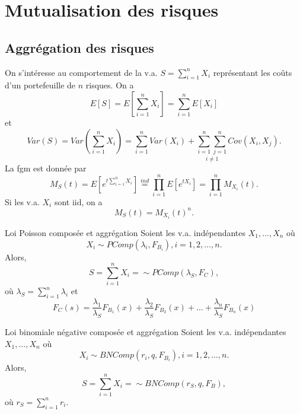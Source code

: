 \chapter{Mutualisation des risques}

\section{Aggrégation des risques}

On s'intéresse au comportement de la v.a. $S = \sum_{i = 1}^{n}X_i$ représentant les coûts  d'un portefeuille de $n$ risques. On a 
$$E[S] = E\left[\sum_{i = 1}^{n} X_i\right] = \sum_{i = 1}^{n}E[X_i]$$
et
$$Var(S) = Var\left(\sum_{i = 1}^{n}X_i\right) = \sum_{i = 1}^{n} Var(X_i) + \underset{i \neq 1}{\sum_{i = 1}^{n}\sum_{j = 1}^{n}}Cov(X_i, X_j).$$
La fgm est donnée par 
$$M_S(t) = E\left[e^{t\sum_{i = 1}^{n}X_i}\right] \stackrel{ind}{=} \prod_{i = 1}^{n} E\left[e^{tX_i}\right] = \prod_{i = 1}^{n}M_{X_i}(t).$$
Si les v.a. $X_i$ sont iid, on a 
$$M_S(t) = M_{X_i}(t)^n.$$ 

\begin{proposition}{Loi Poisson composée et aggrégation}{}
	Soient les v.a. indépendantes $X_1, \dots, X_n$ où
	$$X_i \sim PComp(\lambda_i, F_{B_i}), i = 1, 2, \dots, n.$$
	Alors, 
	$$S = \sum_{i = 1}^{n} X_i = \sim PComp(\lambda_S, F_{C}),$$
	où $\lambda_S = \sum_{i = 1}^{n}\lambda_i$ et 
	$$F_{C}(s) = \frac{\lambda_1}{\lambda_S}F_{B_1}(x) + \frac{\lambda_2}{\lambda_S}F_{B_2}(x) + \dots + \frac{\lambda_n}{\lambda_S}F_{B_n}(x)$$
\end{proposition}

\begin{proposition}{Loi binomiale négative composée et aggrégation}{}
	Soient les v.a. indépendantes $X_1, \dots, X_n$ où
	$$X_i \sim BNComp(r_i, q, F_{B_i}), i = 1, 2, \dots, n.$$
	Alors, 
	$$S = \sum_{i = 1}^{n} X_i = \sim BNComp(r_S, q, F_{B}),$$
	où $r_S = \sum_{i = 1}^{n}r_i$.
\end{proposition}

